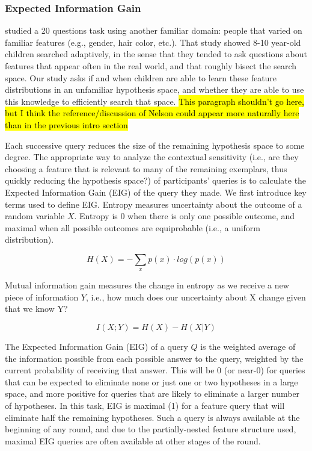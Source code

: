 \documentclass[10pt,letterpaper]{article}
\begin{document}
\subsubsection{Expected Information Gain}



 studied a 20 questions task using another familiar domain: 
people that varied on familiar features (e.g., gender, hair color, etc.). That study 
showed 8-10 year-old children searched adaptively, in the sense that they tended to 
ask questions about features that appear often in the real world, and that roughly 
bisect the search space. Our study asks if and when children are able to learn these 
feature distributions in an unfamiliar hypothesis space, and whether they are able to 
use this knowledge to efficiently search that space.
\hl{This paragraph shouldn't go here, but I think the reference/discussion of
Nelson could appear more naturally here than in the previous intro section}

Each successive query reduces the size of the remaining hypothesis space to some 
degree. The appropriate way to analyze the contextual sensitivity (i.e., are they 
choosing a feature that is relevant to many of the remaining exemplars, thus quickly 
reducing the hypothesis space?) of participants' queries is to calculate the Expected 
Information Gain (EIG) of the query they made. We first introduce key terms used to 
define EIG. Entropy measures uncertainty about the outcome of a random variable 
$X$. Entropy is 0 when there is only one possible outcome, and maximal when all 
possible outcomes are equiprobable (i.e., a uniform distribution).

\begin{equation}
  H(X) = -\sum_{x} p(x) \cdot log(p(x))
\end{equation}

Mutual information gain measures the change in entropy as we receive a new piece 
of information $Y$, i.e., how much does our uncertainty about X change given that 
we know Y?

\begin{equation}
  I(X;Y) = H(X) - H(X|Y)
\end{equation}

The Expected Information Gain (EIG) of a query $Q$ is the weighted average of the 
information possible from each possible answer to the query, weighted by the 
current probability of receiving that answer. This will be 0 (or near-0) for queries that 
can be expected to eliminate none or just one or two hypotheses in a large space, 
and more positive for queries that are likely to eliminate a larger number of 
hypotheses. In this task, EIG is maximal (1) for a feature query that will eliminate 
half the remaining hypotheses. Such a query is always available at the beginning of 
any round, and due to the partially-nested feature structure used, maximal EIG 
queries are often available at other stages of the round.
\end{document}
